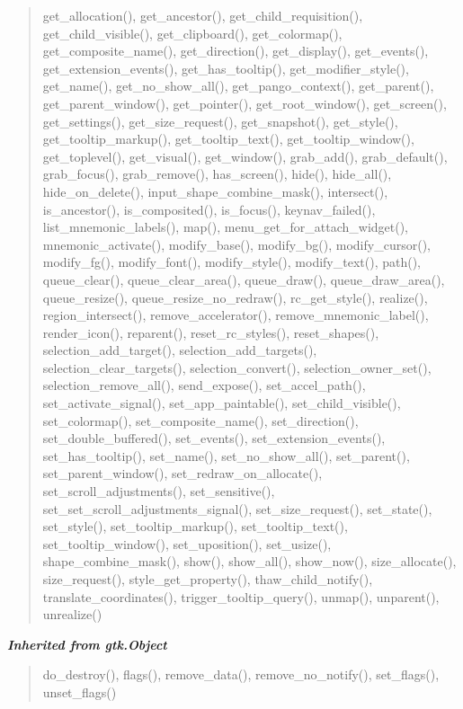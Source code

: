 \begin{quote}
get\_allocation(), get\_ancestor(), get\_child\_requisition(), get\_child\_visible(), get\_clipboard(), get\_colormap(), get\_composite\_name(), get\_direction(), get\_display(), get\_events(), get\_extension\_events(), get\_has\_tooltip(), get\_modifier\_style(), get\_name(), get\_no\_show\_all(), get\_pango\_context(), get\_parent(), get\_parent\_window(), get\_pointer(), get\_root\_window(), get\_screen(), get\_settings(), get\_size\_request(), get\_snapshot(), get\_style(), get\_tooltip\_markup(), get\_tooltip\_text(), get\_tooltip\_window(), get\_toplevel(), get\_visual(), get\_window(), grab\_add(), grab\_default(), grab\_focus(), grab\_remove(), has\_screen(), hide(), hide\_all(), hide\_on\_delete(), input\_shape\_combine\_mask(), intersect(), is\_ancestor(), is\_composited(), is\_focus(), keynav\_failed(), list\_mnemonic\_labels(), map(), menu\_get\_for\_attach\_widget(), mnemonic\_activate(), modify\_base(), modify\_bg(), modify\_cursor(), modify\_fg(), modify\_font(), modify\_style(), modify\_text(), path(), queue\_clear(), queue\_clear\_area(), queue\_draw(), queue\_draw\_area(), queue\_resize(), queue\_resize\_no\_redraw(), rc\_get\_style(), realize(), region\_intersect(), remove\_accelerator(), remove\_mnemonic\_label(), render\_icon(), reparent(), reset\_rc\_styles(), reset\_shapes(), selection\_add\_target(), selection\_add\_targets(), selection\_clear\_targets(), selection\_convert(), selection\_owner\_set(), selection\_remove\_all(), send\_expose(), set\_accel\_path(), set\_activate\_signal(), set\_app\_paintable(), set\_child\_visible(), set\_colormap(), set\_composite\_name(), set\_direction(), set\_double\_buffered(), set\_events(), set\_extension\_events(), set\_has\_tooltip(), set\_name(), set\_no\_show\_all(), set\_parent(), set\_parent\_window(), set\_redraw\_on\_allocate(), set\_scroll\_adjustments(), set\_sensitive(), set\_set\_scroll\_adjustments\_signal(), set\_size\_request(), set\_state(), set\_style(), set\_tooltip\_markup(), set\_tooltip\_text(), set\_tooltip\_window(), set\_uposition(), set\_usize(), shape\_combine\_mask(), show(), show\_all(), show\_now(), size\_allocate(), size\_request(), style\_get\_property(), thaw\_child\_notify(), translate\_coordinates(), trigger\_tooltip\_query(), unmap(), unparent(), unrealize()
\end{quote}

\large{\textbf{\textit{Inherited from gtk.Object}}}

\begin{quote}
do\_destroy(), flags(), remove\_data(), remove\_no\_notify(), set\_flags(), unset\_flags()
\end{quote}

